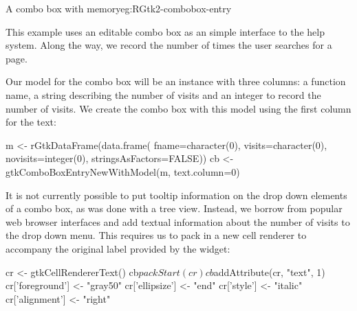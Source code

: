 \begin{example}{A combo box with memory}{eg:RGtk2-combobox-entry}

This example uses an editable combo box as an simple interface to the
\R\/ help system. Along the way, we record the number of times the
user searches for a page.

Our model for the combo box will be an  instance
with three columns: a function name, a string describing the
number of visits and an integer to record the number of visits. We
create the combo box with this model using the first column for the text:
\begin{Schunk}
\begin{Sinput}
 m <- rGtkDataFrame(data.frame(
              fname=character(0), visits=character(0), 
              novisits=integer(0), stringsAsFactors=FALSE))
 cb <- gtkComboBoxEntryNewWithModel(m, text.column=0)
\end{Sinput}
\end{Schunk}

It is not currently possible to put tooltip information on the drop
down elements of a combo box, as was done with a tree view. Instead,
we borrow from popular web browser interfaces and add textual
information about the number of visits to the drop down menu. This
requires us to pack in a new cell renderer to accompany the original
label provided by the  widget:
\begin{Schunk}
\begin{Sinput}
 cr <- gtkCellRendererText()
 cb$packStart(cr)
 cb$addAttribute(cr, "text", 1)
 cr['foreground'] <- "gray50"
 cr['ellipsize'] <- "end"
 cr['style'] <- "italic"
 cr['alignment'] <- "right"
\end{Sinput}
\end{Schunk}




\end{example}
